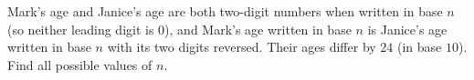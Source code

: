 Mark's age and Janice's age are both two-digit numbers when written in base $n$ (so neither leading digit is $0$), and Mark's age written in base $n$ is Janice's age written in base $n$ with its two digits reversed. Their ages differ by $24$ (in base $10$). Find all possible values of $n$.
